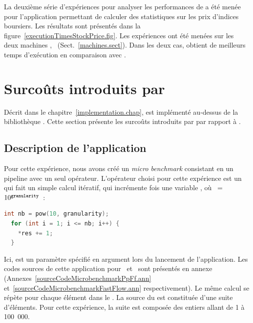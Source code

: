 
La deuxi\`eme s\'erie d'exp\'eriences pour analyser les performances de \PpFf{} a \'et\'e men\'ee pour l'application permettant de calculer des statistiques sur les prix d'indices boursiers. Les r\'esultats sont pr\'esent\'es dans la figure~\ref{executionTimesStockPrice.fig}. Les expériences ont \'et\'e menées sur les deux machines , \ (Sect.~\ref{machines.sect}). Dans les deux cas,  obtient de meilleurs temps d'ex\'ecution en comparaison avec .


\section{Surco\^uts introduits par }
\label{coutsPpFf.sect}



D\'ecrit dans le chapitre~\ref{implementation.chap},  est impl\'ement\'e au-dessus de la biblioth\`eque . Cette section pr\'esente les surco\^uts introduits par  par rapport \`a . 


\subsection{Description de l'application}

Pour cette exp\'erience, nous avons cr\'e\'e un \emph{micro benchmark} consistant en un {pipeline} avec un seul op\'erateur. L'op\'erateur choisi pour cette exp\'erience est un  qui fait un simple calcul it\'eratif, qui incr\'emente   fois une variable , o\`u ~=~$10^{{\tt granularity}}$~:
{
\begin{lstlisting}[language=c++]
  int nb = pow(10, granularity);
  for (int i = 1; i <= nb; i++) {
    *res += 1;   
  }
\end{lstlisting}
} 

Ici,  est un param\`etre sp\'ecifi\'e en argument lors du lancement de l'application. Les codes sources de cette application pour~ et~ sont pr\'esent\'es en annexe (Annexes~\ref{sourceCodeMicrobenchmarkPpFf.ann} et~\ref{sourceCodeMicrobenchmarkFastFlow.ann} respectivement). Le m\^eme calcul se r\'ep\`ete pour chaque \'el\'ement dans le . La source du  est constitu\'ee d'une suite d'\'el\'ements. Pour cette exp\'erience, la suite est compos\'ee des entiers allant de 1 \`a 100~000.  


